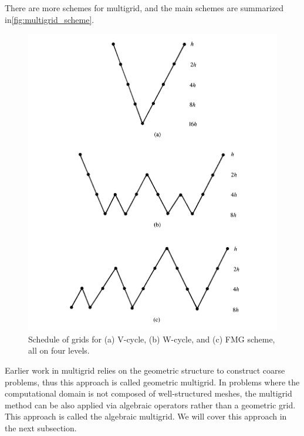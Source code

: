There are more schemes for multigrid, and the main schemes are summarized in\autoref{fig:multigrid_scheme}.
\begin{figure}
    \centering
    \includegraphics[width=\linewidth]{figures/multigrid_scheme.png}
    \caption{Schedule of grids for (a) V-cycle, (b) W-cycle, and (c) FMG scheme,
all on four levels. \citep{10.5555/357695}}
    \label{fig:multigrid_scheme}
\end{figure}

Earlier work in multigrid relies on the geometric structure to construct coarse problems, thus this approach is called geometric multigrid.  In problems where the computational domain is not composed of well-structured meshes, the multigrid method can be also applied via algebraic operators rather than a geometric grid.  This approach is called the algebraic multigrid. We will cover this approach in the next subsection.

